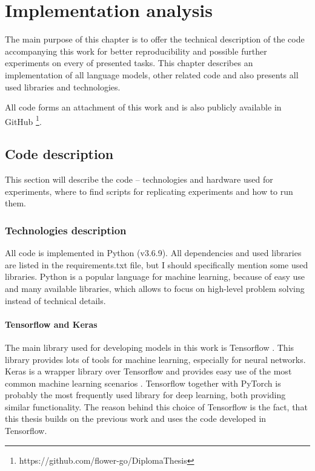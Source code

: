 \chapter{Implementation analysis}
The main purpose of this chapter is to offer the technical description of the code accompanying this work for better reproducibility and possible further experiments on every of presented tasks. This chapter describes an implementation of all language models, other related code and also presents all used libraries and technologies.
\par
All code forms an attachment of this work and is also publicly available in GitHub \footnote{https://github.com/flower-go/DiplomaThesis}.


\section{Code description}
This section will describe the code -- technologies and hardware used for experiments, where to find scripts for replicating experiments and how to run them.
\subsection{Technologies description}
All code is implemented in Python (v3.6.9). All dependencies and used libraries are listed in the requirements.txt file,
but I should specifically mention some used libraries. Python is a popular language for machine learning, because of easy use and many available libraries, which allows to focus on high-level problem solving instead of technical details.
\subsubsection{Tensorflow and Keras}
The main library used for developing models in this work is Tensorflow \citep{tensorflow2015-whitepaper}. This library provides lots of tools for machine learning, especially for neural networks. Keras is a wrapper library over Tensorflow and provides easy use of the most common machine learning scenarios \citep{keras}. Tensorflow together with PyTorch \citep{NEURIPS2019_9015} is probably the most frequently used library for deep learning, both providing similar functionality. The reason behind this choice of Tensorflow is the fact, that this thesis builds on the previous work and uses the code developed in Tensorflow.
